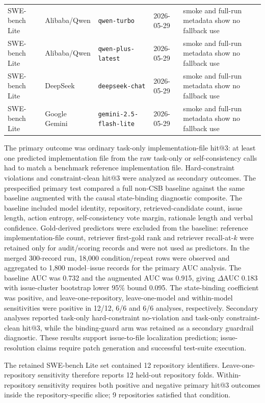 ﻿\documentclass[preprint,12pt,authoryear]{elsarticle}
\begin{document}
\begin{table}[!htbp]
{\begin{tabular}{p{}p{}p{}p{}p{}}
SWE-bench Lite & Alibaba/Qwen & \texttt{qwen-turbo} & 2026-05-29 & smoke and full-run metadata show no fallback use \\
SWE-bench Lite & Alibaba/Qwen & \texttt{qwen-plus-latest} & 2026-05-29 & smoke and full-run metadata show no fallback use \\
SWE-bench Lite & DeepSeek & \texttt{deepseek-chat} & 2026-05-29 & smoke and full-run metadata show no fallback use \\
SWE-bench Lite & Google Gemini & \texttt{gemini-2.5-flash-lite} & 2026-05-29 & smoke and full-run metadata show no fallback use \\
\bottomrule
\end{tabular}%
}
\end{table}

The primary outcome was ordinary task-only implementation-file hit@3: at least one predicted implementation file from the raw task-only or self-consistency calls had to match a benchmark reference implementation file. Hard-constraint violations and constraint-clean hit@3 were analyzed as secondary outcomes. The prespecified primary test compared a full non-CSB baseline against the same baseline augmented with the causal state-binding diagnostic composite. The baseline included model identity, repository, retrieved-candidate count, issue length, action entropy, self-consistency vote margin, rationale length and verbal confidence. Gold-derived predictors were excluded from the baseline: reference implementation-file count, retriever first-gold rank and retriever recall-at-\(k\) were retained only for audit/scoring records and were not used as predictors. In the merged 300-record run, 18,000 condition/repeat rows were observed and aggregated to 1,800 model--issue records for the primary AUC analysis. The baseline AUC was 0.732 and the augmented AUC was 0.915, giving \(\Delta\)AUC 0.183 with issue-cluster bootstrap lower 95\% bound 0.095. The state-binding coefficient was positive, and leave-one-repository, leave-one-model and within-model sensitivities were positive in 12/12, 6/6 and 6/6 analyses, respectively. Secondary analyses reported task-only hard-constraint no-violation and task-only constraint-clean hit@3, while the binding-guard arm was retained as a secondary guardrail diagnostic. These results support issue-to-file localization prediction; issue-resolution claims require patch generation and successful test-suite execution.

The retained SWE-bench Lite set contained 12 repository identifiers. Leave-one-repository sensitivity therefore reports 12 held-out repository folds. Within-repository sensitivity requires both positive and negative primary hit@3 outcomes inside the repository-specific slice; 9 repositories satisfied that condition.
\end{document}
